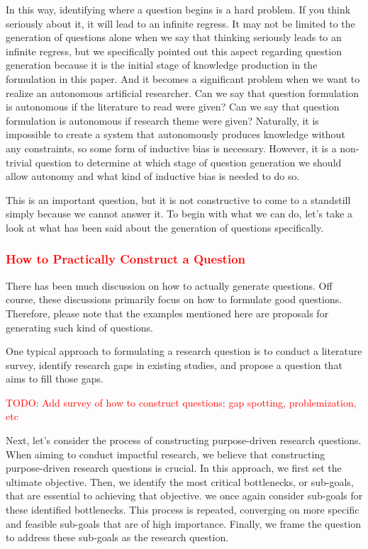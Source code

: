 \documentclass{book}
\begin{document}
In this way, identifying where a question begins is a hard problem. If you think seriously about it, it will lead to an infinite regress. It may not be limited to the generation of questions alone when we say that thinking seriously leads to an infinite regress, but we specifically pointed out this aspect regarding question generation because it is the initial stage of knowledge production in the formulation in this paper. And it becomes a significant problem when we want to realize an autonomous artificial researcher. Can we say that question formulation is autonomous if the literature to read were given? Can we say that question formulation is autonomous if research theme were given? Naturally, it is impossible to create a system that autonomously produces knowledge without any constraints, so some form of inductive bias is necessary. However, it is a non-trivial question to determine at which stage of question generation we should allow autonomy and what kind of inductive bias is needed to do so. 

This is an important question, but it is not constructive to come to a standstill simply because we cannot answer it. To begin with what we can do, let's take a look at what has been said about the generation of questions specifically.

\subsubsection{\textcolor{red}{How to Practically Construct a Question}}

There has been much discussion on how to actually generate questions. Off course, these discussions primarily focus on how to formulate good questions. Therefore, please note that the examples mentioned here are proposals for generating such kind of questions.

One typical approach to formulating a research question is to conduct a literature survey, identify research gaps in existing studies, and propose a question that aims to fill those gaps.

\textcolor{red}{TODO: Add survey of how to construct questions; gap spotting, problemization, etc}

Next, let's consider the process of constructing purpose-driven research questions. When aiming to conduct impactful research, we believe that constructing purpose-driven research questions is crucial. In this approach, we first set the ultimate objective. Then, we identify the most critical bottlenecks, or sub-goals, that are essential to achieving that objective. we once again consider sub-goals for these identified bottlenecks. This process is repeated, converging on more specific and feasible sub-goals that are of high importance. Finally, we frame the question to address these sub-goals as the research question. 
\end{document}
